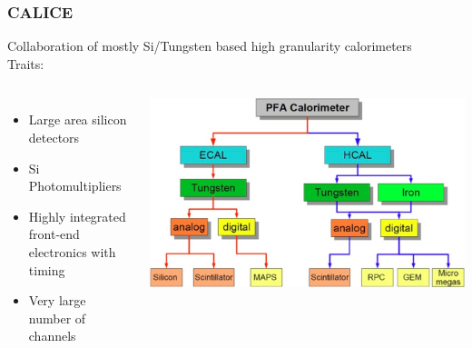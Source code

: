 \documentclass[aspectratio=169]{beamer}
\newcommand{\bluetext}[1]{%
  \textcolor{myBlue}{#1}
}
\begin{document}
\begin{frame}
  \frametitle{CALICE}

  Collaboration of mostly Si/Tungsten based high granularity calorimeters\\[1ex]
  \bluetext{Traits:}
  \begin{columns}[c]
    \begin{itemize}
      \item Large area silicon detectors
      \item Si Photomultipliers
      \item Highly integrated front-end electronics with timing
      \item Very large number of channels
    \end{itemize}

    \includegraphics[width=\linewidth]{figures/CALICE_diagram.png}
  \end{columns}
\end{frame}
\end{document}
